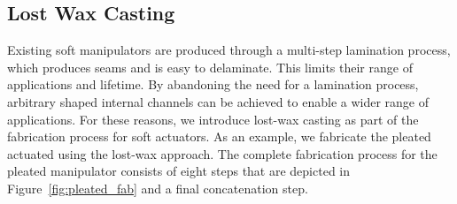\subsection{Lost Wax Casting}
\label{subsec:Fabrication, Lost Wax Casting}
Existing soft manipulators are produced through a multi-step lamination process, which produces seams and is easy to delaminate.
This limits their range of applications and lifetime.
By abandoning the need for a lamination process, arbitrary shaped internal channels can be achieved to enable a wider range of applications.
For these reasons, we introduce lost-wax casting as part of the fabrication process for soft actuators.
As an example, we fabricate the pleated actuated using the lost-wax approach.
The complete fabrication process for the pleated manipulator consists of eight steps that are depicted in Figure~\ref{fig:pleated_fab} and a final concatenation step.

